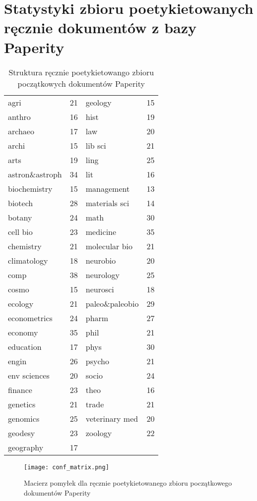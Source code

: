 \documentclass{pracamgr}
\begin{document}
\chapter{Statystyki zbioru poetykietowanych ręcznie dokumentów z bazy Paperity}
\label{paperity-train-initial}

\begin{table}[H]
\centering
\begin{tabular}{@{}llll@{}}
\toprule
agri            & 21 & geology         & 15 \\
anthro          & 16 & hist            & 19 \\
archaeo         & 17 & law             & 20 \\
archi           & 15 & lib sci         & 21 \\
arts            & 19 & ling            & 25 \\
astron\&astroph & 34 & lit             & 16 \\
biochemistry    & 15 & management      & 13 \\
biotech         & 28 & materials sci   & 14 \\
botany          & 24 & math            & 30 \\
cell bio        & 23 & medicine        & 35 \\
chemistry       & 21 & molecular bio   & 21 \\
climatology     & 18 & neurobio        & 20 \\
comp            & 38 & neurology       & 25 \\
cosmo           & 15 & neurosci        & 18 \\
ecology         & 21 & paleo\&paleobio & 29 \\
econometrics    & 24 & pharm           & 27 \\
economy         & 35 & phil            & 21 \\
education       & 17 & phys            & 30 \\
engin           & 26 & psycho          & 21 \\
env sciences    & 20 & socio           & 24 \\
finance         & 23 & theo            & 16 \\
genetics        & 21 & trade           & 21 \\
genomics        & 25 & veterinary med  & 20 \\
geodesy         & 23 & zoology         & 22 \\
geography       & 17 &                 &    \\ \bottomrule

\end{tabular}
\caption{Struktura ręcznie poetykietowango zbioru początkowych dokumentów Paperity}
\label{initial_pap_set}
\end{table}

\begin{figure}[]
\centering
  \texttt{[image: conf\_matrix.png]}
  \caption{Macierz pomyłek dla ręcznie poetykietowanego zbioru początkowego dokumentów Paperity}\label{fig:paperity_confusion_matrix}
\end{figure}
\end{document}
